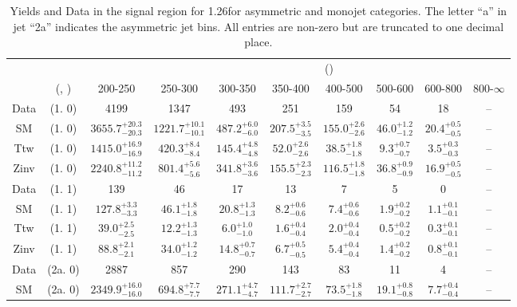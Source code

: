 \begin{table}[h!]
\tiny
\centering
\caption{Yields and Data in the signal region for 1.26\ifb for asymmetric and monojet categories. The letter ``a'' in jet \eg ``2a''  indicates the asymmetric jet bins. All entries are non-zero but are truncated to one decimal place.\label{tab:yieldsall_sig_comb_asym}}
\begin{tabular}
{cccccccccc}
	\hline\hline
&	&	& \multicolumn{8}{c}{\scalht (\gev)}\\ 
	&	 (\njet, \nb) & 200-250 & 250-300 & 300-350 & 350-400 & 400-500 & 500-600 & 600-800 & 800-$\infty$ \\ [0.8ex] 
\hline
	Data & (1. 0) & 4199 & 1347 & 493 & 251 & 159 & 54 & 18 & -- \\[0.5ex] 
	SM & (1. 0) & $3655.7^{+ 20.3 }_{- 20.3 }$ & $1221.7^{+ 10.1 }_{- 10.1 }$ & $487.2^{+ 6.0 }_{- 6.0 }$ & $207.5^{+ 3.5 }_{- 3.5 }$ & $155.0^{+ 2.6 }_{- 2.6 }$ & $46.0^{+ 1.2 }_{- 1.2 }$ & $20.4^{+ 0.5 }_{- 0.5 }$ & -- \\[0.5ex] 
	Ttw & (1. 0) & $1415.0^{+ 16.9 }_{- 16.9 }$ & $420.3^{+ 8.4 }_{- 8.4 }$ & $145.4^{+ 4.8 }_{- 4.8 }$ & $52.0^{+ 2.6 }_{- 2.6 }$ & $38.5^{+ 1.8 }_{- 1.8 }$ & $9.3^{+ 0.7 }_{- 0.7 }$ & $3.5^{+ 0.3 }_{- 0.3 }$ & -- \\[0.5ex] 
	Zinv & (1. 0) & $2240.8^{+ 11.2 }_{- 11.2 }$ & $801.4^{+ 5.6 }_{- 5.6 }$ & $341.8^{+ 3.6 }_{- 3.6 }$ & $155.5^{+ 2.3 }_{- 2.3 }$ & $116.5^{+ 1.8 }_{- 1.8 }$ & $36.8^{+ 0.9 }_{- 0.9 }$ & $16.9^{+ 0.5 }_{- 0.5 }$ & -- \\[0.5ex] 
	Data & (1. 1) & 139 & 46 & 17 & 13 & 7 & 5 & 0 & -- \\[0.5ex] 
	SM & (1. 1) & $127.8^{+ 3.3 }_{- 3.3 }$ & $46.1^{+ 1.8 }_{- 1.8 }$ & $20.8^{+ 1.3 }_{- 1.3 }$ & $8.2^{+ 0.6 }_{- 0.6 }$ & $7.4^{+ 0.6 }_{- 0.6 }$ & $1.9^{+ 0.2 }_{- 0.2 }$ & $1.1^{+ 0.1 }_{- 0.1 }$ & -- \\[0.5ex] 
	Ttw & (1. 1) & $39.0^{+ 2.5 }_{- 2.5 }$ & $12.2^{+ 1.3 }_{- 1.3 }$ & $6.0^{+ 1.0 }_{- 1.0 }$ & $1.6^{+ 0.4 }_{- 0.4 }$ & $2.0^{+ 0.4 }_{- 0.4 }$ & $0.5^{+ 0.2 }_{- 0.2 }$ & $0.3^{+ 0.1 }_{- 0.1 }$ & -- \\[0.5ex] 
	Zinv & (1. 1) & $88.8^{+ 2.1 }_{- 2.1 }$ & $34.0^{+ 1.2 }_{- 1.2 }$ & $14.8^{+ 0.7 }_{- 0.7 }$ & $6.7^{+ 0.5 }_{- 0.5 }$ & $5.4^{+ 0.4 }_{- 0.4 }$ & $1.4^{+ 0.2 }_{- 0.2 }$ & $0.8^{+ 0.1 }_{- 0.1 }$ & -- \\[0.5ex] 
	Data & (2a. 0) & 2887 & 857 & 290 & 143 & 83 & 11 & 4 & -- \\[0.5ex] 
	SM & (2a. 0) & $2349.9^{+ 16.0 }_{- 16.0 }$ & $694.8^{+ 7.7 }_{- 7.7 }$ & $271.1^{+ 4.7 }_{- 4.7 }$ & $111.7^{+ 2.7 }_{- 2.7 }$ & $73.5^{+ 1.8 }_{- 1.8 }$ & $19.1^{+ 0.8 }_{- 0.8 }$ & $7.7^{+ 0.4 }_{- 0.4 }$ & -- \\[0.5ex] 

\end{tabular}
\end{table}
